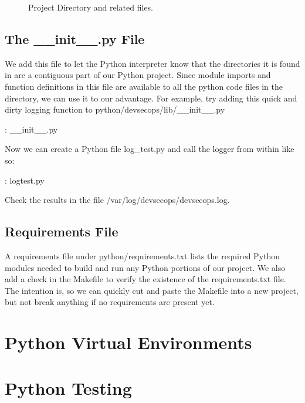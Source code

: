 \begin{figure}[!htb]
	\centering
	
	\caption{Project Directory and related files.}
	\label{pythonfiles}
\end{figure}

\subsection{The \_\_init\_\_.py File}

\justify{}
We add this file to let the Python interpreter know that the directories
it is found in are a contiguous part of our Python project. Since module
imports and function definitions in this file are available to all the
python code files in the directory, we can use it to our advantage. For
example, try adding this quick and dirty logging function to
python/devsecops/lib/\_\_init\_\_.py

\justify{}
\begin{mybox}{\thetcbcounter: \_\_init\_\_.py}
  
\end{mybox}

\justify{}
Now we can create a Python file log\_test.py and call the logger from within like so:

\begin{mybox}{\thetcbcounter: logtest.py}
  
\end{mybox}

\justify{}
Check the results in the file /var/log/devsecops/devsecops.log.

\subsection{Requirements File}

\justify{}
A requirements file under python/requirements.txt lists
the required Python modules needed to build and run any Python portions of our  project.
We also add a check in the Makefile to verify the existence of the requirements.txt file.
The intention is, so we can quickly cut and paste the Makefile into a new project, but
not break anything if no requirements are present yet.

\section{Python Virtual Environments}

\section{Python Testing}

